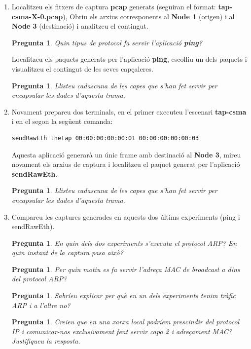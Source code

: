\documentclass[12pt,a4paper]{article}
\newcounter{exercises}
\newtheorem{exer}[exercises]{Pregunta}
\begin{document}
\begin{enumerate}
\item Localitzeu els fitxers de captura \textbf{pcap} generats (seguiran el format: \textbf{tap-csma-X-0.pcap}),
Obriu els arxius corresponents al \textbf{Node 1} (origen) i al \textbf{Node 3}
(destinació) i analitzeu el contingut.

\begin{exer} Quin tipus de protocol fa servir l'aplicació \textbf{ping}? \end{exer}

Localitzeu els paquets generats per l'aplicació \textbf{ping}, escolliu un dels paquets i visualitzeu el contingut de les seves capçaleres.

\begin{exer} Llisteu cadascuna de les capes que s'han fet servir per encapsular les dades d'aquesta trama. \end{exer}

\item Novament prepareu dos terminals, en el primer executeu l'escenari \textbf{tap-csma} i en el segon la següent comanda:
\begin{lstlisting}[language=bash]
sendRawEth thetap 00:00:00:00:00:01 00:00:00:00:00:03
\end{lstlisting}

Aquesta aplicació generarà un únic frame amb destinació al \textbf{Node 3}, mireu novament els arxius de captura i localitzeu
el paquet generat per l'aplicació \textbf{sendRawEth}.

\begin{exer} Llisteu cadascuna de les capes que s'han fet servir per encapsular les dades d'aquesta trama. \end{exer}

\item Compareu les captures generades en aquests dos últims experiments (ping i sendRawEth).

\begin{exer} En quin dels dos experiments s'executa el protocol ARP? En quin instant de la captura pasa això? \end{exer}
\begin{exer} Per quin motiu es fa servir l'adreça MAC de broadcast a dins del protocol ARP? \end{exer}
\begin{exer} Sabríeu explicar per què en un dels experiments tenim tràfic ARP i a l'altre no? \end{exer}
\begin{exer} Creieu que en una xarxa local podríem prescindir del protocol IP i comunicar-nos exclusivament fent servir capa 2 i adreçament MAC? Justifiqueu la resposta. \end{exer}
\end{enumerate}
\end{document}
